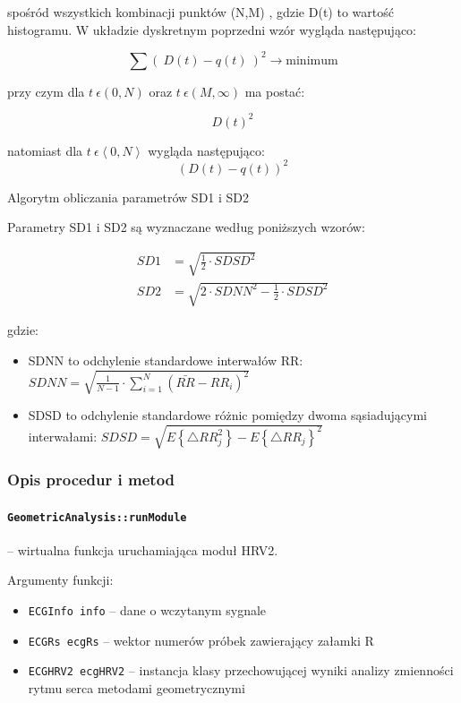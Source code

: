 \documentclass[a4paper, 11pt]{article}
\begin{document}
spośród wszystkich kombinacji punktów (N,M) , gdzie D(t) to wartość
histogramu. W układzie dyskretnym poprzedni wzór wygląda następująco:

\begin{equation}
\sum(\: D(t)-q(t)\:)^{2}\rightarrow \text{minimum}
\end{equation}


przy czym dla $t\:\epsilon(0,N)$ oraz $t\:\epsilon(M,\infty)$ ma
postać: 

\begin{equation}
D(t)^{2}
\end{equation}


natomiast dla $t\:\epsilon\left\langle 0,N\right\rangle$ wygląda
następująco: 
\begin{equation}
(D(t)-q(t))^{2}
\end{equation}

Algorytm obliczania parametrów SD1 i SD2

Parametry SD1 i SD2 są wyznaczane według poniższych wzorów:

\begin{align}
SD1 &= \sqrt{\frac{1}{2}\cdot SDSD^{2}} \\
SD2 &= \sqrt{2\cdot SDNN^{2}-\frac{1}{2}\cdot SDSD^{2}}
\end{align}


gdzie:
\begin{itemize}
\item SDNN to odchylenie standardowe interwałów RR: $SDNN=\sqrt{\frac{1}{N-1}\cdot\sum_{i=1}^{N}\left(\bar{RR}-RR_{i}\right)^{2}}$
\item SDSD to odchylenie standardowe różnic pomiędzy dwoma sąsiadującymi
interwałami: $SDSD=\sqrt{E\left\{ \triangle RR_{j}^{2}\right\} -E\left\{ \triangle RR_{j}\right\} ^{2}}$
\end{itemize}

\subsubsection{Opis procedur i metod }
\label{sec:hrv2:procs}

\paragraph{\texttt{GeometricAnalysis::runModule}} -- wirtualna funkcja uruchamiająca moduł HRV2.

\medskip{}


Argumenty funkcji:
\begin{itemize}
\item \verb+ECGInfo info+ -- dane o wczytanym sygnale
\item \verb+ECGRs ecgRs+ -- wektor numerów próbek zawierający załamki R
\item \verb+ECGHRV2 ecgHRV2+ -- instancja klasy przechowującej wyniki analizy zmienności
rytmu serca metodami geometrycznymi
\end{itemize}
\medskip{}
\end{document}
